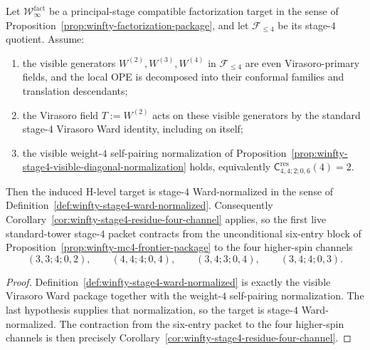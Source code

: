 \begin{proposition}
\label{prop:winfty-stage4-ward-inheritance}
\ClaimStatusConditional{}
Let $\mathcal{W}^{\mathrm{fact}}_\infty$ be a principal-stage
compatible factorization target in the sense of
Proposition~\ref{prop:winfty-factorization-package}, and let
$\mathcal{F}_{\le 4}$ be its stage-$4$ quotient. Assume:
\begin{enumerate}[label=\textup{(\roman*)}]
\item the visible generators $W^{(2)},W^{(3)},W^{(4)}$ in
 $\mathcal{F}_{\le 4}$ are even Virasoro-primary fields, and the local
 OPE is decomposed into their conformal families and translation
 descendants;
\item the Virasoro field $T:=W^{(2)}$ acts on these visible generators
 by the standard stage-$4$ Virasoro Ward identity, including on
 itself;
\item the visible weight-$4$ self-pairing normalization of
 Proposition~\ref{prop:winfty-stage4-visible-diagonal-normalization}
 holds, equivalently
 $\mathsf{C}^{\mathrm{res}}_{4,4;2;0,6}(4)=2$.
\end{enumerate}
Then the induced H-level target is stage-$4$ Ward-normalized in the
sense of Definition~\ref{def:winfty-stage4-ward-normalized}. Consequently
Corollary~\ref{cor:winfty-stage4-residue-four-channel} applies, so the
first live standard-tower stage-$4$ packet contracts from the
unconditional six-entry block of
Proposition~\ref{prop:winfty-mc4-frontier-package} to the four
higher-spin channels
\[
(3,3;4;0,2),\qquad
(4,4;4;0,4),\qquad
(3,4;3;0,4),\qquad
(3,4;4;0,3).
\]
\end{proposition}

\begin{proof}
Definition~\ref{def:winfty-stage4-ward-normalized} is exactly the
visible Virasoro Ward package together with the weight-$4$ self-pairing
normalization. The last hypothesis supplies that normalization, so the
target is stage-$4$ Ward-normalized. The contraction from the six-entry
packet to the four higher-spin channels is then precisely
Corollary~\ref{cor:winfty-stage4-residue-four-channel}.
\end{proof}

